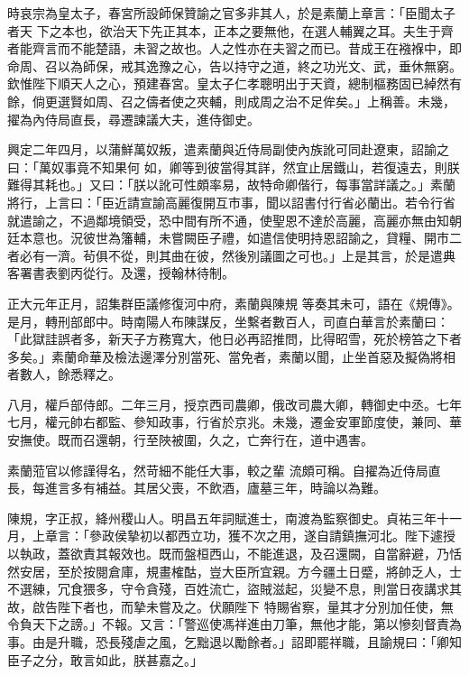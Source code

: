 \begin{pinyinscope}
 時哀宗為皇太子，春宮所設師保贊諭之官多非其人，於是素蘭上章言：「臣聞太子者天
 下之本也，欲治天下先正其本，正本之要無他，在選人輔翼之耳。夫生于齊者能齊言而不能楚語，未習之故也。人之性亦在夫習之而已。昔成王在襁褓中，即命周、召以為師保，戒其逸豫之心，告以持守之道，終之功光文、武，垂休無窮。欽惟陛下順天人之心，預建春宮。皇太子仁孝聰明出于天資，總制樞務固已綽然有餘，倘更選賢如周、召之儔者使之夾輔，則成周之治不足侔矣。」上稱善。未幾，擢為內侍局直長，尋遷諫議大夫，進侍御史。



 興定二年四月，以蒲鮮萬奴叛，遣素蘭與近侍局副使內族訛可同赴遼東，詔諭之曰：「萬奴事竟不知果何
 如，卿等到彼當得其詳，然宜止居鐵山，若復遠去，則朕難得其耗也。」又曰：「朕以訛可性頗率易，故特命卿偕行，每事當詳議之。」素蘭將行，上言曰：「臣近請宣諭高麗復開互市事，聞以詔書付行省必蘭出。若令行省就遣諭之，不過鄰境領受，恐中間有所不通，使聖恩不達於高麗，高麗亦無由知朝廷本意也。況彼世為籓輔，未嘗闕臣子禮，如遣信使明持恩詔諭之，貸糧、開市二者必有一濟。茍俱不從，則其曲在彼，然後別議圖之可也。」上是其言，於是遣典客署書表劉丙從行。及還，授翰林待制。



 正大元年正月，詔集群臣議修復河中府，素蘭與陳規
 等奏其未可，語在《規傳》。是月，轉刑部郎中。時南陽人布陳謀反，坐繫者數百人，司直白華言於素蘭曰：「此獄詿誤者多，新天子方務寬大，他日必再詔推問，比得昭雪，死於榜笞之下者多矣。」素蘭命華及檢法邊澤分別當死、當免者，素蘭以聞，止坐首惡及擬偽將相者數人，餘悉釋之。



 八月，權戶部侍郎。二年三月，授京西司農卿，俄改司農大卿，轉御史中丞。七年七月，權元帥右都監、參知政事，行省於京兆。未幾，遷金安軍節度使，兼同、華安撫使。既而召還朝，行至陜被圍，久之，亡奔行在，道中遇害。



 素蘭蒞官以修謹得名，然苛細不能任大事，較之輩
 流頗可稱。自擢為近侍局直長，每進言多有補益。其居父喪，不飲酒，廬墓三年，時論以為難。



 陳規，字正叔，絳州稷山人。明昌五年詞賦進士，南渡為監察御史。貞祐三年十一月，上章言：「參政侯摯初以都西立功，獲不次之用，遂自請鎮撫河北。陛下遽授以執政，蓋欲責其報效也。既而盤桓西山，不能進退，及召還闕，自當辭避，乃恬然安居，至於按閱倉庫，規畫榷酤，豈大臣所宜親。方今疆土日蹙，將帥乏人，士不選練，冗食猥多，守令貪殘，百姓流亡，盜賊滋起，災變不息，則當日夜講求其故，啟告陛下者也，而摯未嘗及之。伏願陛下
 特賜省察，量其才分別加任使，無令負天下之謗。」不報。又言：「警巡使馮祥進由刀筆，無他才能，第以慘刻督責為事。由是升職，恐長殘虐之風，乞黜退以勵餘者。」詔即罷祥職，且諭規曰：「卿知臣子之分，敢言如此，朕甚嘉之。」




\end{pinyinscope}

